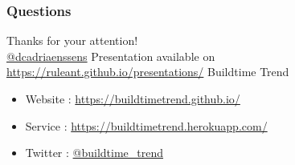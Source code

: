 \documentclass[14pt]{beamer}
\begin{document}
  \begin{frame}
   \frametitle{Questions}
    Thanks for your attention!\\
    \vfill
    \href{https://twitter.com/dcadriaenssens}{\small{@dcadriaenssens}}
    \vfill
    Presentation available on \href{https://ruleant.github.io/presentations/}{\small{https://ruleant.github.io/presentations/}}
    \vfill
    Buildtime Trend
    \begin{itemize}
      \item Website : \href{https://buildtimetrend.github.io/}{\small{https://buildtimetrend.github.io/}}
      \item Service : \href{https://buildtimetrend.herokuapp.com/}{\small{https://buildtimetrend.herokuapp.com/}}
      \item Twitter : \href{https://twitter.com/buildtime_trend}{\small{@buildtime\_trend}}
    \end{itemize}
  \end{frame}
\end{document}
